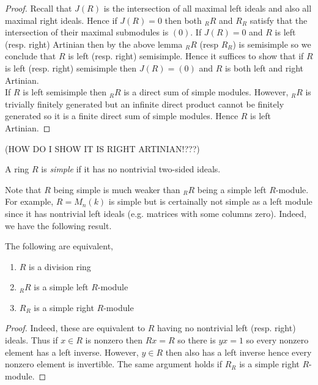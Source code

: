 \documentclass[12pt]{article}
\begin{document}
\begin{proof}
Recall that $J(R)$ is the intersection of all maximal left ideals and also all maximal right ideals. Hence if $J(R) = 0$ then both ${}_R R$ and $R_{R}$ satisfy that the intersection of their maximal submodules is $(0)$.
If $J(R) = 0$ and $R$ is left (resp. right) Artinian then by the above lemma ${}_R R$ (resp $R_R$) is semisimple so we conclude that $R$ is left (resp. right) semisimple. Hence it suffices to show that if $R$ is left (resp. right) semisimple then $J(R) = (0)$ and $R$ is both left and right Artinian.
\bigskip\\
If $R$ is left semisimple then ${}_R R$ is a direct sum of simple modules. However, ${}_R R$ is trivially finitely generated but an infinite direct product cannot be finitely generated so it is a finite direct sum of simple modules. Hence $R$ is left Artinian.
\end{proof}

(HOW DO I SHOW IT IS RIGHT ARTINIAN!???)

\begin{defn}
A ring $R$ is \textit{simple} if it has no nontrivial two-sided ideals.
\end{defn}

\begin{rmk}
Note that $R$ being simple is much weaker than ${}_R R$ being a simple left $R$-module. For example, $R = M_n(k)$ is simple but is certainally not simple as a left module since it has nontrivial left ideals (e.g. matrices with some columns zero). Indeed, we have the following result.
\end{rmk}

\begin{prop}
The following are equivalent,
\begin{enumerate}
\item $R$ is a division ring
\item ${}_R R$ is a simple left $R$-module
\item $R_{R}$ is a simple right $R$-module
\end{enumerate}
\end{prop}

\begin{proof}
Indeed, these are equivalent to $R$ having no nontrivial left (resp. right) ideals. Thus if $x \in R$ is nonzero then $Rx = R$ so there is $yx = 1$ so every nonzero element has a left inverse. However, $y \in R$ then also has a left inverse hence every nonzero element is invertible. The same argument holds if $R_{R}$ is a simple right $R$-module.
\end{proof}
\end{document}
